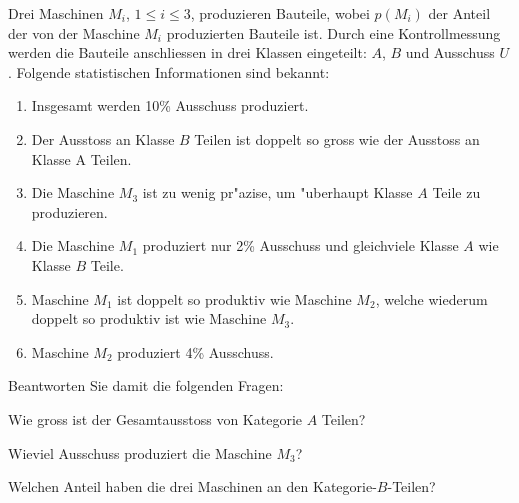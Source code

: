 Drei Maschinen $M_i$, $1\le i\le 3$, produzieren Bauteile, wobei $p(M_i)$
der Anteil der von der Maschine $M_i$ produzierten Bauteile ist.
Durch eine Kontrollmessung werden die Bauteile anschliessen in
drei Klassen eingeteilt: $A$, $B$ und Ausschuss $U$. Folgende statistischen
Informationen sind bekannt:
\begin{enumerate}
\item Insgesamt werden 10\% Ausschuss produziert.
\item Der Ausstoss an Klasse $B$ Teilen ist doppelt so gross wie
der Ausstoss an Klasse A Teilen.
\item Die Maschine $M_3$ ist zu wenig pr"azise, um "uberhaupt
Klasse $A$ Teile zu produzieren.
\item Die Maschine $M_1$ produziert nur 2\% Ausschuss und gleichviele
Klasse $A$ wie Klasse $B$ Teile.
\item Maschine $M_1$ ist doppelt so produktiv wie Maschine $M_2$, welche
wiederum doppelt so produktiv ist wie Maschine $M_3$.
\item Maschine $M_2$ produziert 4\% Ausschuss.
\end{enumerate}
Beantworten Sie damit die folgenden Fragen:
\begin{teilaufgaben}
\item
Wie gross ist der Gesamtausstoss von Kategorie $A$ Teilen?
\item
Wieviel Ausschuss produziert die Maschine $M_3$?
\item
Welchen Anteil haben die drei Maschinen an den Kategorie-$B$-Teilen?
\end{teilaufgaben}


